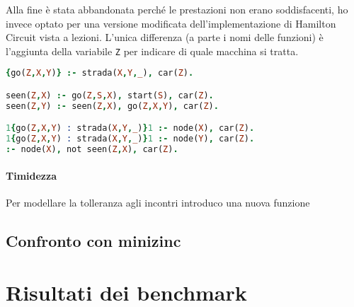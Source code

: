 \documentclass[12pt, a4paper]{article}
\begin{document}
Alla fine è stata abbandonata perché le prestazioni non erano soddisfacenti, ho invece optato per una versione modificata dell'implementazione di Hamilton Circuit vista a lezioni.
L'unica differenza (a parte i nomi delle funzioni) è l'aggiunta della variabile \lstinline{Z} per indicare di quale macchina si tratta.

\begin{lstlisting}[language=prolog]
{go(Z,X,Y)} :- strada(X,Y,_), car(Z).

seen(Z,X) :- go(Z,S,X), start(S), car(Z).
seen(Z,Y) :- seen(Z,X), go(Z,X,Y), car(Z).

1{go(Z,X,Y) : strada(X,Y,_)}1 :- node(X), car(Z).
1{go(Z,X,Y) : strada(X,Y,_)}1 :- node(Y), car(Z).
:- node(X), not seen(Z,X), car(Z).
\end{lstlisting}

\paragraph{Timidezza}
Per modellare la tolleranza agli incontri introduco una nuova funzione 

\subsection{Confronto con minizinc}

\section{Risultati dei benchmark}
\end{document}
